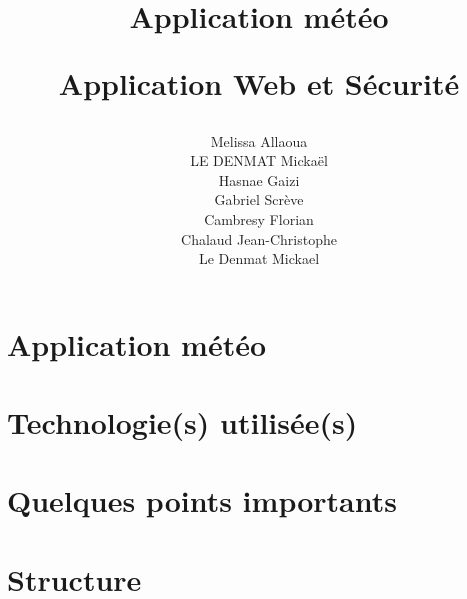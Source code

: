 \documentclass[a4paper, 12pt, french]{article}
\title{
	\Huge
	\textbf{Application météo}
	\vspace{0.4cm}

	\LARGE
	Application Web et Sécurité
}
\author{
	Melissa Allaoua \\
        LE DENMAT Mickaël \\
        Hasnae Gaizi \\
        Gabriel Scrève \\Cambresy Florian \\
	Chalaud Jean-Christophe \\
	Le Denmat Mickael
}
\begin{document}
	

	\newpage
	\renewcommand{\contentsname}{Table des matières}
	\tableofcontents

	\section{Application météo}
	\section{Technologie(s) utilisée(s)}
	\section{Quelques points importants}
	\section{Structure}
\end{document}
